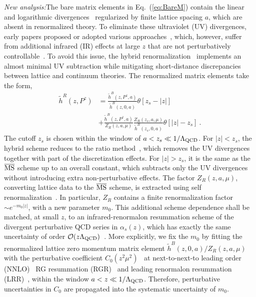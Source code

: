 \documentclass[prl,aps,twocolumn,preprintnumbers, showpacs, nofootinbib,superscriptaddress,notitlepage]{revtex4-1}
\begin{document}
\textit{New analysis:}\quad The bare matrix elements in Eq.~(\ref{eq:BareM}) contain the linear and logarithmic divergences~\cite{Alexandrou:2017huk,Ji:2015jwa, Ji:2017oey,Ishikawa:2017faj,Green:2017xeu,Li:2018tpe} regularized by finite lattice spacing $a$, which are absent in renormalized theory. To eliminate these ultraviolet (UV) divergences, early papers proposed or adopted various  approaches~\cite{Green:2017xeu,Chen:2017mzz,Alexandrou:2017huk,Izubuchi:2018srq,Radyushkin:2018cvn,Braun:2018brg}, which, however, suffer from additional infrared (IR) effects at large $z$ that are not perturbatively controllable~\cite{Ji:2020brr,LatticePartonLPC:2021gpi}. To avoid this issue, the hybrid renormalization~\cite{Ji:2020brr,Chou:2022drv} implements an almost minimal UV subtraction while mitigating short-distance discrepancies between lattice and continuum theories. The renormalized matrix elements take the form,
\begin{align}\label{eq:HybridM}
\tilde{h}^{R}(z,P^z) & = \frac{\tilde{h}^{B}(z,P^z,a)}{\tilde{h}^{B}(z,0,a)} \theta\left[ z_s - \left|z\right| \right] \nonumber\\
&+ \frac{\tilde{h}^{B}(z,P^z,a)}{Z_{R}(z,a,\mu)} \frac{Z_{R}(z_s,a,\mu)}{\tilde{h}^{B}(z_s,0,a)} \theta\left[ \left|z\right| - z_s \right] \ .
\end{align}
The cutoff $z_s$ is chosen within the window of $a < z_s \ll 1/\Lambda_{\rm QCD}$. For $|z|<z_s$, the hybrid scheme reduces to the ratio method~\cite{Radyushkin:2017cyf,Orginos:2017kos,Izubuchi:2018srq}, which removes the UV divergences together with part of the discretization effects. For $|z|>z_s$, it is the same as the $\overline{\rm MS}$ scheme up to an overall constant, which subtracts only the UV divergences without introducing extra non-perturbative effects. The factor $Z_{R}(z,a,\mu)$, converting lattice data to the $\overline{\rm MS}$ scheme, is extracted using self renormalization~\cite{LatticePartonLPC:2021gpi}. In particular, $Z_R$ contains a finite renormalization  factor $\sim e^{-m_0 |z|}$, with a new parameter $m_0$. This additional scheme dependence shall be matched, at small $z$, to an infrared-renormalon resummation scheme of the divergent perturbative QCD series in $\alpha_s(z)$, which has exactly the same uncertainty of order ${\cal O}(z\Lambda_{\rm QCD})$~\cite{Pineda:2001zq,Braun:2018brg,Zhang:2023bxs}. More explicitly, we fix the $m_0$ by fitting the renormalized lattice zero momentum matrix element $\tilde{h}^{B}(z,0,a)/Z_{R}(z,a,\mu)$ with the perturbative coefficient $C_0\left(z^2\mu^2\right)$~\cite{Izubuchi:2018srq} at next-to-next-to leading order (NNLO)~\cite{Li:2020xml,Chen:2020ody} RG resummation (RGR)~\cite{Su:2022fiu} and leading renormalon resummation (LRR)~\cite{Zhang:2023bxs}, within the window $a<z\ll1/\Lambda_{\rm QCD}$. Therefore, perturbative uncertainties in $C_0$ are propagated into the systematic uncertainty of $m_0$.
\end{document}
